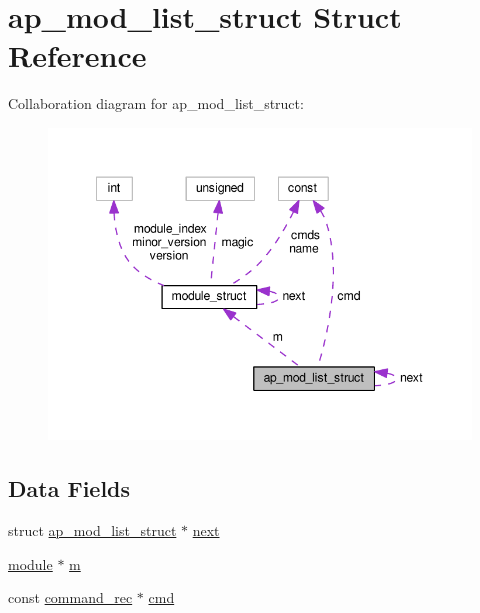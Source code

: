 \hypertarget{structap__mod__list__struct}{}\section{ap\+\_\+mod\+\_\+list\+\_\+struct Struct Reference}
\label{structap__mod__list__struct}


Collaboration diagram for ap\+\_\+mod\+\_\+list\+\_\+struct\+:
\nopagebreak
\begin{figure}[H]
\begin{center}
\leavevmode
\includegraphics[width=348pt]{structap__mod__list__struct__coll__graph}
\end{center}
\end{figure}
\subsection*{Data Fields}
\begin{DoxyCompactItemize}
\item 
struct \hyperlink{structap__mod__list__struct}{ap\+\_\+mod\+\_\+list\+\_\+struct} $\ast$ \hyperlink{structap__mod__list__struct_a5d9956f476d3f04d9def380f65e986b5}{next}
\item 
\hyperlink{group__APACHE__CORE__CONFIG_ga0ea4f633a5f9f88e1603aaeb1f2b2e69}{module} $\ast$ \hyperlink{structap__mod__list__struct_a9b377e9f5acc85df2bf8fa59d61ea85a}{m}
\item 
const \hyperlink{group__APACHE__CORE__CONFIG_ga79f84e70f072880482a3fd004ae48710}{command\+\_\+rec} $\ast$ \hyperlink{structap__mod__list__struct_adaebd57a879c2622e36fb33bad59f290}{cmd}
\end{DoxyCompactItemize}


